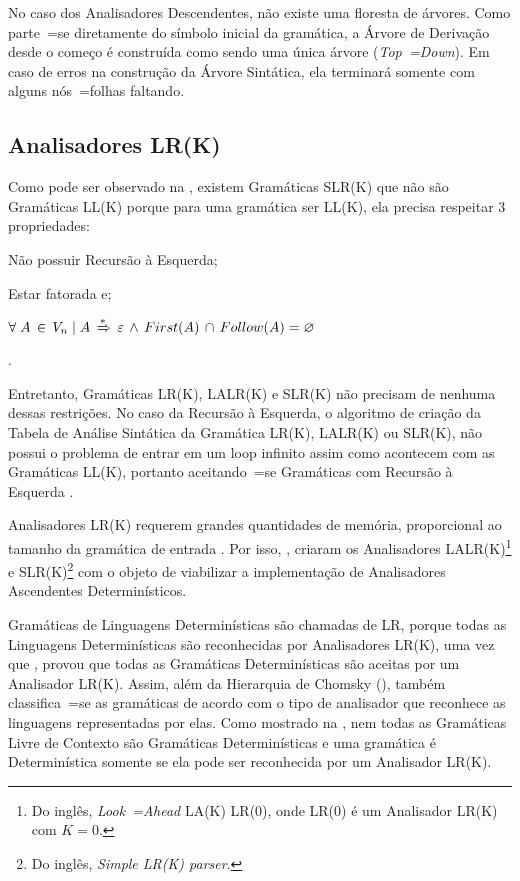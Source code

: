 No caso dos Analisadores Descendentes,
não existe uma floresta de árvores.
Como parte~=se diretamente do símbolo inicial da gramática,
a Árvore de Derivação desde o começo é construída como sendo uma única árvore (\textit{Top~=Down}).
Em caso de erros na construção da Árvore Sintática,
ela terminará somente com alguns nós~=folhas faltando.


\subsection{Analisadores LR(K)}

Como pode ser observado na ,
existem Gramáticas SLR(K) que não são Gramáticas LL(K) porque para uma gramática ser LL(K),
ela precisa respeitar 3 propriedades:
\begin{inparaenum}[1)]
    \item Não possuir Recursão à Esquerda;
    \item Estar fatorada e;
    \item $\forall\; A\, \in\, V_n\; |\; A\,
            \xRightarrow{*}\, \varepsilon\,
            \land\, First(A)\, \cap\, Follow(A) = \varnothing$
\end{inparaenum}%
\cite{ahoCompilerDragonBook}.

Entretanto,
Gramáticas LR(K), LALR(K) e
SLR(K) não precisam de nenhuma dessas restrições.
No caso da Recursão à Esquerda,
o algoritmo de criação da Tabela de Análise Sintática da Gramática LR(K),
LALR(K) ou SLR(K),
não possui o problema de entrar em um loop infinito assim como acontecem com as Gramáticas LL(K),
portanto aceitando~=se Gramáticas com Recursão à Esquerda \cite{ahoCompilerDragonBook}.

Analisadores LR(K) requerem grandes quantidades de memória,
proporcional ao tamanho da gramática de entrada \cite{complexityOfLRKTesting}.
Por isso,
,
criaram os Analisadores LALR(K)\footnote{
Do inglês, \textit{Look~=Ahead} LA(K) LR(0),
onde LR(0) é um Analisador LR(K) com $K=0$.
}
e SLR(K)\footnote{
Do inglês, \textit{Simple LR(K) parser}.
}
com o objeto de viabilizar a implementação de Analisadores Ascendentes Determinísticos.

Gramáticas de Linguagens Determinísticas são chamadas de LR,
porque todas as Linguagens Determinísticas são reconhecidas por Analisadores LR(K),
uma vez que ,
provou que todas as Gramáticas Determinísticas são aceitas por um Analisador LR(K).
Assim,
além da Hierarquia de Chomsky (),
também classifica~=se as gramáticas de acordo com o tipo de analisador que reconhece as linguagens representadas por elas.
Como mostrado na ,
nem todas as Gramáticas Livre de Contexto são Gramáticas Determinísticas e
uma gramática é Determinística somente se ela pode ser reconhecida por um Analisador LR(K).

